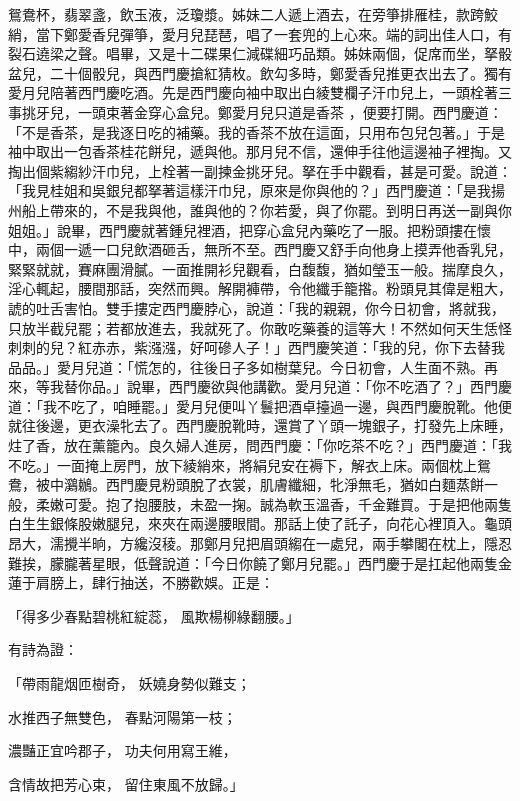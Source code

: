 鴛鴦杯，翡翠盞，飲玉液，泛瓊漿。姊妹二人遞上酒去，在旁箏排雁桂，款跨鮫綃，當下鄭愛香兒彈箏，愛月兒琵琶，唱了一套兜的上心來。端的詞出佳人口，有裂石遶梁之聲。唱畢，又是十二碟果仁減碟細巧品類。姊妹兩個，促席而坐，拏骰盆兒，二十個骰兒，與西門慶搶紅猜枚。飲勾多時，鄭愛香兒推更衣出去了。獨有愛月兒陪著西門慶吃酒。先是西門慶向袖中取出白綾雙欄子汗巾兒上，一頭栓著三事挑牙兒，一頭束著金穿心盒兒。鄭愛月兒只道是香茶 ，便要打開。西門慶道：「不是香茶，是我逐日吃的補藥。我的香茶不放在這面，只用布包兒包著。」于是袖中取出一包香茶桂花餅兒，遞與他。那月兒不信，還伸手往他這邊袖子裡掏。又掏出個紫縐紗汗巾兒，上栓著一副揀金挑牙兒。拏在手中觀看，甚是可愛。說道：「我見桂姐和吳銀兒都拏著這樣汗巾兒，原來是你與他的？」西門慶道：「是我揚州船上帶來的，不是我與他，誰與他的？你若愛，與了你罷。到明日再送一副與你姐姐。」說畢，西門慶就著鍾兒裡酒，把穿心盒兒內藥吃了一服。把粉頭摟在懷中，兩個一遞一口兒飲酒砸舌，無所不至。西門慶又舒手向他身上摸弄他香乳兒，緊緊就就，賽麻團滑膩。一面推開衫兒觀看，白馥馥，猶如瑩玉一般。揣摩良久，淫心輒起，腰間那話，突然而興。解開褲帶，令他纖手籠揝。粉頭見其偉是粗大，諕的吐舌害怕。雙手摟定西門慶脖心，說道：「我的親親，你今日初會，將就我，只放半截兒罷；若都放進去，我就死了。你敢吃藥養的這等大！不然如何天生恁怪刺刺的兒？紅赤赤，紫漒漒，好呵磣人子！」西門慶笑道：「我的兒，你下去替我品品。」愛月兒道：「慌怎的，往後日子多如樹葉兒。今日初會，人生面不熟。再來，等我替你品。」說畢，西門慶欲與他講歡。愛月兒道：「你不吃酒了？」西門慶道：「我不吃了，咱睡罷。」愛月兒便叫丫鬟把酒卓擡過一邊，與西門慶脫靴。他便就往後邊，更衣澡牝去了。西門慶脫靴時，還賞了丫頭一塊銀子，打發先上床睡，炷了香，放在薰籠內。良久婦人進房，問西門慶：「你吃茶不吃？」西門慶道：「我不吃。」一面掩上房門，放下綾綃來，將絹兒安在褥下，解衣上床。兩個枕上鴛鴦，被中鸂鶒。西門慶見粉頭脫了衣裳，肌膚纖細，牝淨無毛，猶如白麵蒸餅一般，柔嫩可愛。抱了抱腰肢，未盈一掬。誠為軟玉溫香，千金難買。于是把他兩隻白生生銀條股嫩腿兒，來夾在兩邊腰眼間。那話上使了託子，向花心裡頂入。龜頭昂大，濡攪半晌，方纔沒稜。那鄭月兒把眉頭縐在一處兒，兩手攀閣在枕上，隱忍難挨，朦朧著星眼，低聲說道：「今日你饒了鄭月兒罷。」西門慶于是扛起他兩隻金蓮于肩膀上，肆行抽送，不勝歡娛。正是：

「得多少春點碧桃紅綻蕊，  風欺楊柳綠翻腰。」

有詩為證：

「帶雨龍烟匝樹奇，  妖嬈身勢似難支；

水推西子無雙色，  春點河陽第一枝；

濃豔正宜吟郡子，  功夫何用寫王維，

含情故把芳心束，  留住東風不放歸。」

